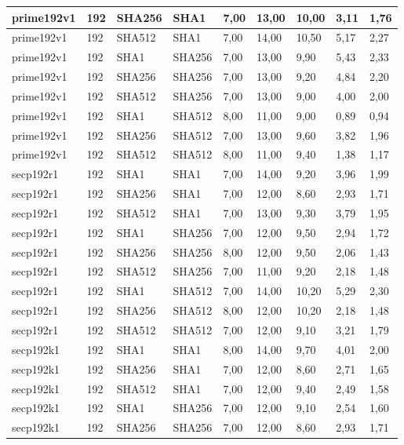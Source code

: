 \begin{longtable}{| l | l | l | l | l |l |l |l |l |}
prime192v1 & 192 & SHA256 & SHA1 & 7,00 & 13,00 & 10,00 & 3,11 & 1,76 \\ \hline 
prime192v1 & 192 & SHA512 & SHA1 & 7,00 & 14,00 & 10,50 & 5,17 & 2,27 \\ \hline 
prime192v1 & 192 & SHA1 & SHA256 & 7,00 & 13,00 & 9,90 & 5,43 & 2,33 \\ \hline 
prime192v1 & 192 & SHA256 & SHA256 & 7,00 & 13,00 & 9,20 & 4,84 & 2,20 \\ \hline 
prime192v1 & 192 & SHA512 & SHA256 & 7,00 & 13,00 & 9,00 & 4,00 & 2,00 \\ \hline 
prime192v1 & 192 & SHA1 & SHA512 & 8,00 & 11,00 & 9,00 & 0,89 & 0,94 \\ \hline 
prime192v1 & 192 & SHA256 & SHA512 & 7,00 & 13,00 & 9,60 & 3,82 & 1,96 \\ \hline 
prime192v1 & 192 & SHA512 & SHA512 & 8,00 & 11,00 & 9,40 & 1,38 & 1,17 \\ \hline 
secp192r1 & 192 & SHA1 & SHA1 & 7,00 & 14,00 & 9,20 & 3,96 & 1,99 \\ \hline 
secp192r1 & 192 & SHA256 & SHA1 & 7,00 & 12,00 & 8,60 & 2,93 & 1,71 \\ \hline 
secp192r1 & 192 & SHA512 & SHA1 & 7,00 & 13,00 & 9,30 & 3,79 & 1,95 \\ \hline 
secp192r1 & 192 & SHA1 & SHA256 & 7,00 & 12,00 & 9,50 & 2,94 & 1,72 \\ \hline 
secp192r1 & 192 & SHA256 & SHA256 & 8,00 & 12,00 & 9,50 & 2,06 & 1,43 \\ \hline 
secp192r1 & 192 & SHA512 & SHA256 & 7,00 & 11,00 & 9,20 & 2,18 & 1,48 \\ \hline 
secp192r1 & 192 & SHA1 & SHA512 & 7,00 & 14,00 & 10,20 & 5,29 & 2,30 \\ \hline 
secp192r1 & 192 & SHA256 & SHA512 & 8,00 & 12,00 & 10,20 & 2,18 & 1,48 \\ \hline 
secp192r1 & 192 & SHA512 & SHA512 & 7,00 & 12,00 & 9,10 & 3,21 & 1,79 \\ \hline 
secp192k1 & 192 & SHA1 & SHA1 & 8,00 & 14,00 & 9,70 & 4,01 & 2,00 \\ \hline 
secp192k1 & 192 & SHA256 & SHA1 & 7,00 & 12,00 & 8,60 & 2,71 & 1,65 \\ \hline 
secp192k1 & 192 & SHA512 & SHA1 & 7,00 & 12,00 & 9,40 & 2,49 & 1,58 \\ \hline 
secp192k1 & 192 & SHA1 & SHA256 & 7,00 & 12,00 & 9,10 & 2,54 & 1,60 \\ \hline 
secp192k1 & 192 & SHA256 & SHA256 & 7,00 & 12,00 & 8,60 & 2,93 & 1,71 \\ \hline 

\end{longtable}
